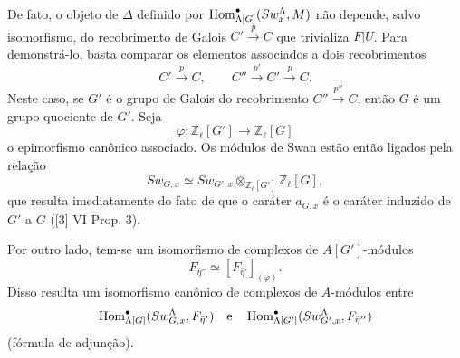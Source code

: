 De fato, o objeto de $\Delta$ definido por $\operatorname{Hom}^\bullet_{\Lambda[G]}(Sw_x^\Lambda,M)$ não depende, salvo isomorfismo, do recobrimento de Galois $C'\xrightarrow{p}C$ que trivializa $F|U$. Para demonstrá-lo, basta comparar os elementos associados a dois recobrimentos
\[
C'\xrightarrow{p}C,\qquad C''\xrightarrow{p'}C'\xrightarrow{p}C.
\]
Neste caso, se $G'$ é o grupo de Galois do recobrimento $C''\xrightarrow{p''}C$, então $G$ é um grupo quociente de $G'$. Seja
\[
\varphi:\mathbb Z_\ell[G']\longrightarrow \mathbb Z_\ell[G]
\]
o epimorfismo canônico associado. Os módulos de Swan estão então ligados pela relação
\[
Sw_{G,x}\simeq Sw_{G',x}\otimes_{\mathbb Z_\ell[G']}\mathbb Z_\ell[G],
\]
que resulta imediatamente do fato de que o caráter $a_{G,x}$ é o caráter induzido de $G'$ a $G$ ([3] VI Prop. 3).

Por outro lado, tem-se um isomorfismo de complexos de $A[G']$-módulos
\[
F_{\bar\eta''}\simeq [F_{\bar\eta'}]_{(\varphi)}.
\]
Disso resulta um isomorfismo canônico de complexos de $A$-módulos entre
\[
\operatorname{Hom}^\bullet_{\Lambda[G]}(Sw_{G,x}^\Lambda,F_{\bar\eta'})
\quad\text{e}\quad
\operatorname{Hom}^\bullet_{\Lambda[G']}(Sw_{G',x}^\Lambda,F_{\bar\eta''})
\]
(fórmula de adjunção).
